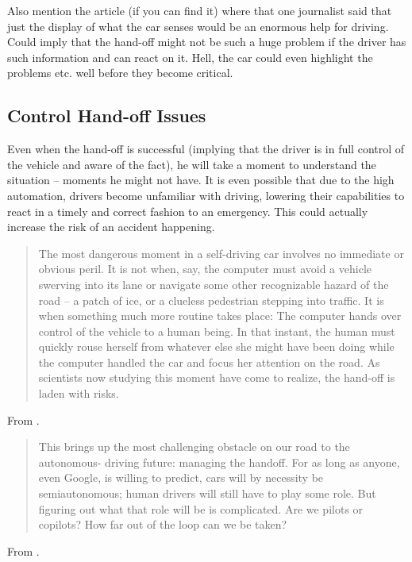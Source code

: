 \documentclass{acm_proc_article-sp}
\begin{document}
Also mention the article (if you can find it) where that one journalist said that just the display of what the car senses would be an enormous help for driving.
Could imply that the hand-off might not be such a huge problem if the driver has such information and can react on it.
Hell, the car could even highlight the problems etc. well before they become critical.

\subsection{Control Hand-off Issues}
\label{hand_off_issue}

Even when the hand-off is successful (implying that the driver is in full control of the vehicle and aware of the fact), he will take a moment to understand the situation – moments he might not have.
It is even possible that due to the high automation, drivers become unfamiliar with driving, lowering their capabilities to react in a timely and correct fashion to an emergency.
This could actually increase the risk of an accident happening.

\begin{quote}
The most dangerous moment in a self-driving car involves no immediate or obvious peril.
It is not when, say, the computer must avoid a vehicle swerving into its lane or navigate some other recognizable hazard of the road -- a patch of ice, or a clueless pedestrian stepping into traffic.
It is when something much more routine takes place: The computer hands over control of the vehicle to a human being.
In that instant, the human must quickly rouse herself from whatever else she might have been doing while the computer handled the car and focus her attention on the road.
As scientists now studying this moment have come to realize, the hand-off is laden with risks.
\end{quote}
From \cite{www:huffington_post}.

\begin{quote}
This brings up the most challenging obstacle on our road to the autonomous- driving future: managing the handoff.
For as long as anyone, even Google, is willing to predict, cars will by necessity be semiautonomous; human drivers will still have to play some role.
But figuring out what that role will be is complicated.
Are we pilots or copilots? How far out of the loop can we be taken?
\end{quote}
From \cite{www:wired}.
\end{document}
